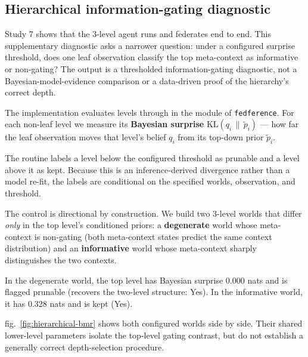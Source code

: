 \documentclass[
  english,
]{article}
\theoremstyle{plain}
\theoremstyle{definition}
\theoremstyle{remark}
\theoremstyle{definition}
\begin{document}
\subsection{Hierarchical information-gating
diagnostic}\label{sec:results-hierarchical-bmr}

Study 7 shows that the 3-level agent runs and federates end to end. This
supplementary diagnostic asks a narrower question: under a configured
surprise threshold, does one leaf observation classify the top
meta-context as informative or non-gating? The output is a thresholded
information-gating diagnostic, not a Bayesian-model-evidence comparison
or a data-driven proof of the hierarchy's correct depth.

The implementation evaluates levels through
 in the 
module of \texttt{fedference}. For each non-leaf level we measure its
\textbf{Bayesian surprise} \(\mathrm{KL}(q_i \,\|\, \tilde p_i)\) ---
how far the leaf observation moves that level's belief \(q_i\) from its
top-down prior \(\tilde p_i\).

The routine labels a level below the configured threshold as prunable
and a level above it as kept. Because this is an inference-derived
divergence rather than a model re-fit, the labels are conditional on the
specified worlds, observation, and threshold.

The control is directional by construction. We build two 3-level worlds
that differ \emph{only} in the top level's conditioned priors: a
\textbf{degenerate} world whose meta-context is non-gating (both
meta-context states predict the same context distribution) and an
\textbf{informative} world whose meta-context sharply distinguishes the
two contexts.

In the degenerate world, the top level has Bayesian surprise 0.000 nats
and is flagged prunable (recovers the two-level structure: Yes). In the
informative world, it has 0.328 nats and is kept (Yes).

fig.~\ref{fig:hierarchical-bmr} shows both configured worlds side by
side. Their shared lower-level parameters isolate the top-level gating
contrast, but do not establish a generally correct depth-selection
procedure.
\end{document}
